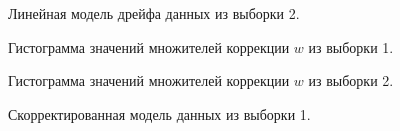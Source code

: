 \begin{figure}[H]
	\caption{Линейная модель дрейфа данных из выборки 2.}
	\label{ris:image1}
\end{figure}

\begin{figure}[H]
	\caption{Гистограмма значений множителей коррекции $w$ из выборки 1.}
	\label{ris:hist1}
\end{figure}

\begin{figure}[H]
	\caption{Гистограмма значений множителей коррекции $w$ из выборки 2.}
	\label{ris:hist2}
\end{figure}

\begin{figure}[H]
	\caption{Скорректированная модель данных из выборки 1.}
	\label{ris:hist2}
\end{figure}

